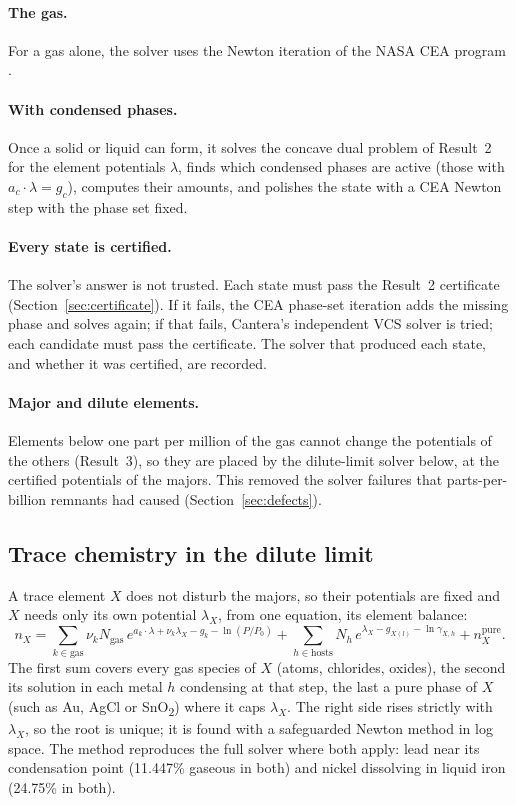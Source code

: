\documentclass[11pt,a4paper]{article}
\begin{document}
\paragraph{The gas.} For a gas alone, the solver uses the Newton iteration of the NASA CEA program \citep{gordon1994}.
\paragraph{With condensed phases.} Once a solid or liquid can form, it solves the concave dual problem of Result~2 for the element potentials $\lambda$, finds which condensed phases are active (those with $a_c\cdot\lambda = g_c$), computes their amounts, and polishes the state with a CEA Newton step with the phase set fixed.
\paragraph{Every state is certified.} The solver's answer is not trusted. Each state must pass the Result~2 certificate (Section~\ref{sec:certificate}). If it fails, the CEA phase-set iteration adds the missing phase and solves again; if that fails, Cantera's independent VCS solver is tried; each candidate must pass the certificate. The solver that produced each state, and whether it was certified, are recorded.
\paragraph{Major and dilute elements.} Elements below one part per million of the gas cannot change the potentials of the others (Result~3), so they are placed by the dilute-limit solver below, at the certified potentials of the majors. This removed the solver failures that parts-per-billion remnants had caused (Section~\ref{sec:defects}).

\subsection{Trace chemistry in the dilute limit}
A trace element $X$ does not disturb the majors, so their potentials are fixed and $X$ needs only its own potential $\lambda_X$, from one equation, its element balance:
\begin{equation}\label{eq:dilute}
n_X = \sum_{k\in\text{gas}} \nu_k N_{\text{gas}}\, e^{a_k\cdot\lambda+\nu_k\lambda_X-g_k-\ln(P/P_0)} + \sum_{h\in\text{hosts}} N_h\, e^{\lambda_X - g_{X(l)} - \ln\gamma_{X,h}} + n_X^{\text{pure}}.
\end{equation}
The first sum covers every gas species of $X$ (atoms, chlorides, oxides), the second its solution in each metal $h$ condensing at that step, the last a pure phase of $X$ (such as Au, AgCl or SnO\textsubscript{2}) where it caps $\lambda_X$. The right side rises strictly with $\lambda_X$, so the root is unique; it is found with a safeguarded Newton method in log space. The method reproduces the full solver where both apply: lead near its condensation point (11.447\% gaseous in both) and nickel dissolving in liquid iron (24.75\% in both).
\end{document}
